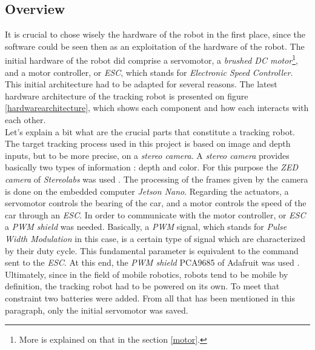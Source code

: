 		\subsection{Overview}
		
		It is crucial to chose wisely the hardware of the robot in the first place, since
		the software could be seen then as an exploitation of the hardware of 
		the robot. The initial hardware of the robot did comprise
		a servomotor, a \textit{brushed DC motor}\footnote{More is explained 
		on that in the section \vref{motor}.}, and a motor controller, or \textit{ESC}, which
		stands for \textit{ Electronic Speed Controller}.
		\\\indent This initial architecture had to be adapted for several reasons.
		The latest hardware architecture of the tracking robot is
		presented on figure \vref{hardwarearchitecture}, which
		shows each component and how each interacts with each other.
		\\\indent Let's explain a bit what are the crucial parts
		that constitute a tracking robot. The target tracking process used
		in this project is based on image and depth inputs, but to be more
		precise, on a \textit{stereo camera}. A \textit{stereo camera}
		provides basically two types of information : depth and color.
		For this purpose the \textit{ZED camera} of \textit{Stereolabs}
		was used \cite{zeddoc}. The processing of the frames
		given by the camera is done on the embedded computer
		\textit{Jetson Nano}. Regarding the actuators, a servomotor
		controls the bearing of the car, and a motor controls the speed
		of the car through an \textit{ESC}. In order to communicate
		with the motor controller, or \textit{ESC} a \textit{PWM shield}
		was needed. Basically, a \textit{PWM} signal, which stands for
		\textit{Pulse Width Modulation} in this case, is a certain type
		of signal which are characterized by their duty cycle. This 
		fundamental parameter is equivalent to the command sent 
		to the \textit{ESC}. At this end, the \textit{PWM shield} PCA9685
		of Adafruit was used \cite{adafruitpwm}. Ultimately, since
		in the field of mobile robotics, robots tend to be mobile by definition,
		the tracking robot had to be powered on its own. To 
		meet that constraint two batteries were added. From all that has
		been mentioned in this paragraph, only the initial servomotor was
		saved.
		
		\begin{figure}
			\label{hardwarearchitecture}
		\end{figure}

